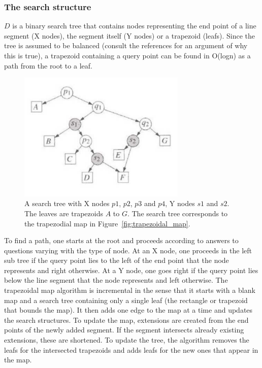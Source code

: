 \subsubsection{The search structure}
$D$ is a binary search tree that contains nodes representing the end point of a line segment (X nodes), the segment itself (Y nodes) or a trapezoid (leafs). Since the tree is assumed to be balanced (consult the references for an argument of why this is true), a trapezoid containing a query point can be found in O(logn) as a path from the root to a leaf. 

\begin{figure}[]
    \centering
      \includegraphics[width=80mm]{images/tree.pdf}
    \caption{A search tree with X nodes $p1$, $p2$, $p3$ and $p4$, Y nodes $s1$ and $s2$. The leaves are trapezoids $A$ to $G$. The search tree corresponds to the trapezodial map in Figure~\ref{fig:trapezoidal_map}.}
    \label{fig:tree}
\end{figure}

To find a path, one starts at the root and proceeds according to answers to questions varying with the type of node. At an X node, one proceeds in the left sub tree if the query point lies to the left of the end point that the node represents and right otherwise. At a Y node, one goes right if the query point lies below the line segment that the node represents and left otherwise.
The trapezoidal map algorithm is incremental in the sense that it starts with a blank map and a search tree containing only a single leaf (the rectangle or trapezoid that bounds the map). It then adds one edge to the map at a time and updates the search structures. To update the map, extensions are created from the end points of the newly added segment. If the segment intersects already existing extensions, these are shortened. To update the tree, the algorithm removes the leafs for the intersected trapezoids and adds leafs for the new ones that appear in the map.

